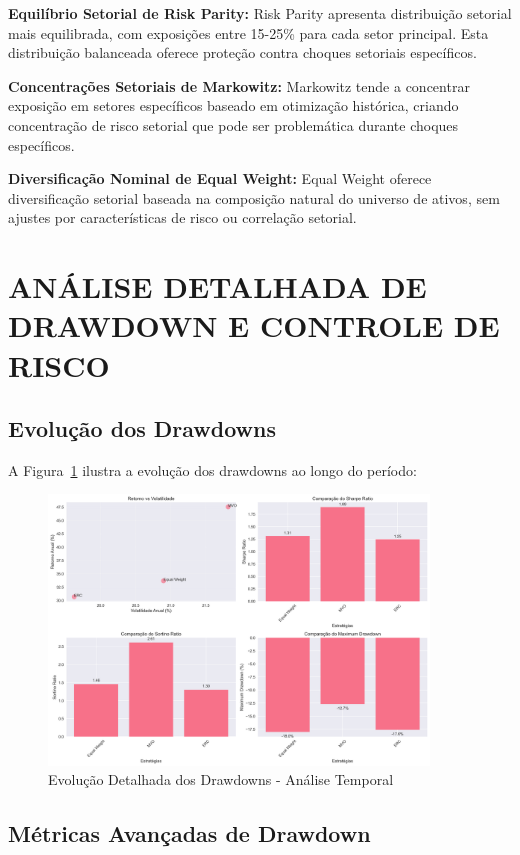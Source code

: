 \textbf{Equilíbrio Setorial de Risk Parity:} Risk Parity apresenta distribuição setorial mais equilibrada, com exposições entre 15-25\% para cada setor principal. Esta distribuição balanceada oferece proteção contra choques setoriais específicos.

\textbf{Concentrações Setoriais de Markowitz:} Markowitz tende a concentrar exposição em setores específicos baseado em otimização histórica, criando concentração de risco setorial que pode ser problemática durante choques específicos.

\textbf{Diversificação Nominal de Equal Weight:} Equal Weight oferece diversificação setorial baseada na composição natural do universo de ativos, sem ajustes por características de risco ou correlação setorial.

\section{ANÁLISE DETALHADA DE DRAWDOWN E CONTROLE DE RISCO}

\subsection{Evolução dos Drawdowns}

A Figura~\ref{fig:drawdowns_detalhada} ilustra a evolução dos drawdowns ao longo do período:

\begin{figure}[H]
\centering
\includegraphics[width=0.90\textwidth]{figures/performance_comparativa.png}
\caption{Evolução Detalhada dos Drawdowns - Análise Temporal}
\label{fig:drawdowns_detalhada}
\end{figure}

\subsection{Métricas Avançadas de Drawdown}

